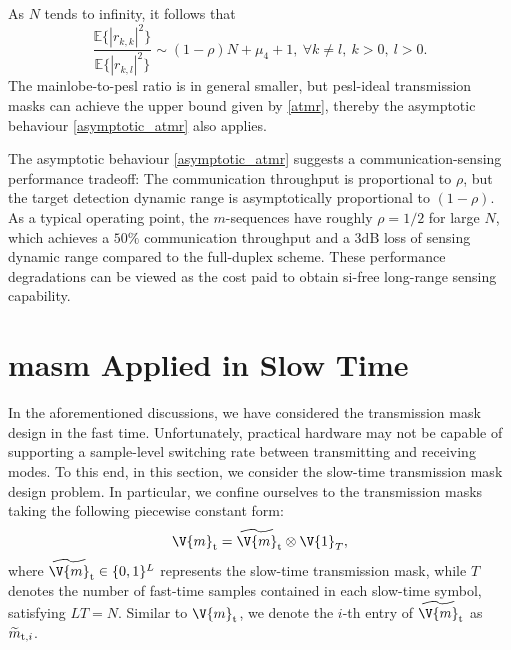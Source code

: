 \documentclass[journal,a4paper,10pt, romanappendices]{IEEEtran}
\begin{document}
As $N$ tends to infinity, it follows that
\begin{equation}\label{asymptotic_atmr}
\frac{\mathbb{E}\{|r_{k,k}|^2\}}{\mathbb{E}\{|r_{k,l}|^2\}} \sim (1-\rho)N + \mu_4+1,~\forall k\neq l,~k>0,~l>0.
\end{equation}
The mainlobe-to-\ac{pesl} ratio is in general smaller, but \ac{pesl}-ideal transmission masks can achieve the upper bound given by \eqref{atmr}, thereby the asymptotic behaviour \eqref{asymptotic_atmr} also applies. 
\begin{remark}
The asymptotic behaviour \eqref{asymptotic_atmr} suggests a communication-sensing performance tradeoff: The communication throughput is proportional to $\rho$, but the target detection dynamic range is asymptotically proportional to $(1-\rho)$. As a typical operating point, the $m$-sequences have roughly $\rho=1/2$ for large $N$, which achieves a $50\%$ communication throughput and a 3dB loss of sensing dynamic range compared to the full-duplex scheme. These performance degradations can be viewed as the cost paid to obtain \ac{si}-free long-range sensing capability.
\end{remark}

\section{\ac{masm} Applied in Slow Time}\label{sec:slow_time}
In the aforementioned discussions, we have considered the transmission mask design in the fast time. Unfortunately, practical hardware may not be capable of supporting a sample-level switching rate between transmitting and receiving modes. To this end, in this section, we consider the slow-time transmission mask design problem. In particular, we confine ourselves to the transmission masks taking the following piecewise constant form:
\begin{equation}\label{piecewise_constant}
\V{m}_{\rm t} = \widetilde{\V{m}}_{\rm t} \otimes \V{1}_{T},
\end{equation}
where $\widetilde{\V{m}}_{\rm t}\in\{0,1\}^L$ represents the slow-time transmission mask, while $T$ denotes the number of fast-time samples contained in each slow-time symbol, satisfying $LT=N$. Similar to $\V{m}_{\rm t}$, we denote the $i$-th entry of $\widetilde{\V{m}}_{\rm t}$ as $\widetilde{m}_{{\rm t},i}$.
\end{document}
